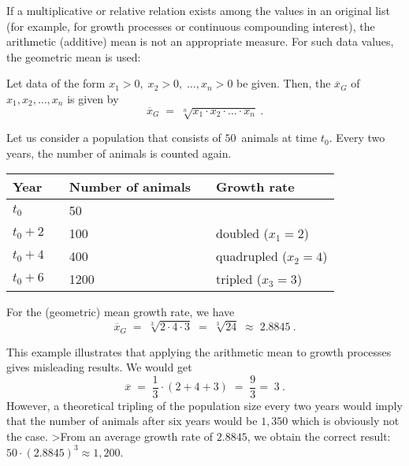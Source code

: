 \begin{MIntro}
If a multiplicative or relative relation exists among the values in an original list (for example, 
for growth processes or continuous compounding interest), the arithmetic (additive) mean is not an 
appropriate measure. For such data values, the geometric mean is used:

\begin{MInfo}
Let data of the form $x_{1}>0,\;x_{2}>0,\;\ldots ,x_{n}>0$ be given. 
Then, the  $\overline{x}_{G}$ of $x_{1},x_{2},\ldots ,x_{n}$ is given by
$$
\overline{x}_{G}\; =\; \sqrt[n]{x_{1}\cdot x_{2}\cdot \ldots \cdot x_{n}}\: .
$$
\end{MInfo}

\begin{MExample}
Let us consider a population that consists of $50$~animals at time $t_{0}$. Every two years, the number 
of animals is counted again.

\begin{center}
\begin{tabular}{|l|l|l|l|l|}
\hline
Year & & Number of animals & & Growth rate \\ \hline
$t_{0}$ & & 50 \\ \hline
$t_{0}+2$ & & 100 & & doubled ($x_{1}=2$)\\ \hline
$t_{0}+4$ & & 400 & & quadrupled  ($x_{2}=4$)\\ \hline
$t_{0}+6$ & & 1200 & & tripled ($x_{3}=3$)\\ \hline
\end{tabular}
\end{center}

For the (geometric) mean growth rate, we have
$$
\overline{x}_G\; =\; \sqrt[3]{2\cdot 4\cdot 3}\; =\; \sqrt[3]{24}\; \approx\; 2.8845\: .
$$
\end{MExample}

This example illustrates that applying the arithmetic mean to growth processes gives misleading results. We would get
$$
\overline{x}\; =\;\frac{1}{3}\cdot (2+4+3)\; =\; \frac{9}{3}=\; 3\: .
$$
However, a theoretical tripling of the population size every two years would imply 
that the number of animals after six years would be $1{,}350$ which is obviously not the case. 
>From an average growth rate of $2.8845$, we obtain the correct result: $50\cdot (2.8845)^{3}\approx 1{,}200$.


\end{MIntro}
